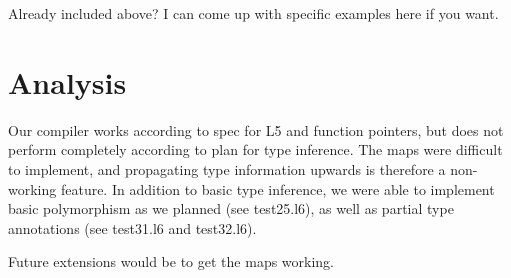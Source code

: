 \documentclass{article}
\begin{document}
Already included above? I can come up with specific examples here if you want.

\section{Analysis}

Our compiler works according to spec for L5 and function pointers, but does not perform completely according to plan for type inference. The maps were difficult to implement, and propagating type information upwards is therefore a non-working feature. In addition to basic type inference, we were able to implement basic polymorphism as we planned (see test25.l6), as well as partial type annotations (see test31.l6 and test32.l6).

 Future extensions would be to get the maps working. 
 
\end{document}
